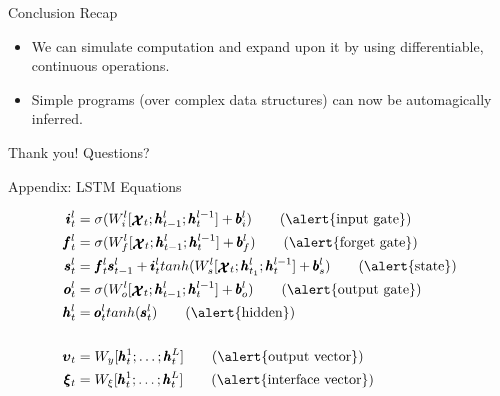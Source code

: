\documentclass{beamer}
\newcommand{\xx}{\pmb{\raisebox{-1.5pt}{$\mathcal{X}$}}}
\newcommand{\hh}{\pmb{h}}
\newcommand{\ii}{\pmb{i}}
\newcommand{\oo}{\pmb{o}}
\newcommand{\ff}{\pmb{f}}
\newcommand{\Ss}{\pmb{s}}
\newcommand{\Cc}{\pmb{c}}
\newcommand{\bb}{\pmb{b}}
\begin{document}
\begin{frame}{Conclusion}
	\alert{Recap}\\
	\begin{itemize}
	\item We can simulate computation and expand upon it by using differentiable, continuous operations.\\
	\item Simple programs (over complex data structures) can now be automagically inferred.\\
	\end{itemize}
\end{frame}

\begin{frame}{Thank you!}
	\centering
	\alert{Questions?}
\end{frame}

\begin{frame}{Appendix: LSTM Equations}

	\begin{align}
	\ii_t^l &= \sigma(W_i^l[\xx_t;\hh_{t-1}^l;\hh_t^{l-1}]+\bb_i^l)   \tag{\alert{input gate}}\\
	\ff_t^l &= \sigma(W_f^l[\xx_t;\hh_{t-1}^l;\hh_t^{l-1}]+\bb_f^l)	\tag{\alert{forget gate}}\\
	\Ss_t^l &= \ff_t^l\Ss_{t-1}^l + \ii_t^ltanh(W_s^l[\xx_t;\hh_{t_1}^l;\hh_t^{l-1}] + \bb_s^l)		\tag{\alert{state}}\\
	\oo_t^l &= \sigma(W_o^l[\xx_t;\hh_{t-1}^l;\hh_t^{l-1}]+\bb_o^l)		\tag{\alert{output gate}}\\
	\hh_t^l &= \oo_t^ltanh(\Ss_t^l)		\tag{\alert{hidden}}\\
	\nonumber \\ 
	\pmb{\upsilon}_t &= W_y[\hh_t^1;\dots;\hh_t^L]		\tag{\alert{output vector}}\\
	\pmb{\xi}_t &= W_{\xi}[\hh_t^1;\dots;\hh_t^L]		\tag{\alert{interface vector}}
	\end{align}
\end{frame}
\end{document}
